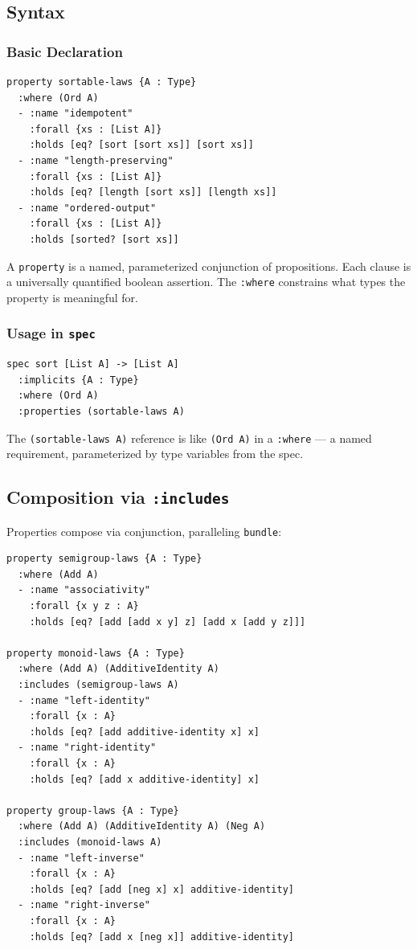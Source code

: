 \documentclass[11pt]{article}
\begin{document}
\subsection{Syntax}
\label{sec:org81e4d5a}

\subsubsection{Basic Declaration}
\label{sec:org1de4fc8}

\begin{verbatim}
property sortable-laws {A : Type}
  :where (Ord A)
  - :name "idempotent"
    :forall {xs : [List A]}
    :holds [eq? [sort [sort xs]] [sort xs]]
  - :name "length-preserving"
    :forall {xs : [List A]}
    :holds [eq? [length [sort xs]] [length xs]]
  - :name "ordered-output"
    :forall {xs : [List A]}
    :holds [sorted? [sort xs]]
\end{verbatim}

A \texttt{property} is a named, parameterized conjunction of propositions. Each clause
is a universally quantified boolean assertion. The \texttt{:where} constrains what
types the property is meaningful for.
\subsubsection{Usage in \texttt{spec}}
\label{sec:orgfc98e01}

\begin{verbatim}
spec sort [List A] -> [List A]
  :implicits {A : Type}
  :where (Ord A)
  :properties (sortable-laws A)
\end{verbatim}

The \texttt{(sortable-laws A)} reference is like \texttt{(Ord A)} in a \texttt{:where} --- a named
requirement, parameterized by type variables from the spec.
\subsection{Composition via \texttt{:includes}}
\label{sec:org95991e5}

Properties compose via conjunction, paralleling \texttt{bundle}:

\begin{verbatim}
property semigroup-laws {A : Type}
  :where (Add A)
  - :name "associativity"
    :forall {x y z : A}
    :holds [eq? [add [add x y] z] [add x [add y z]]]

property monoid-laws {A : Type}
  :where (Add A) (AdditiveIdentity A)
  :includes (semigroup-laws A)
  - :name "left-identity"
    :forall {x : A}
    :holds [eq? [add additive-identity x] x]
  - :name "right-identity"
    :forall {x : A}
    :holds [eq? [add x additive-identity] x]

property group-laws {A : Type}
  :where (Add A) (AdditiveIdentity A) (Neg A)
  :includes (monoid-laws A)
  - :name "left-inverse"
    :forall {x : A}
    :holds [eq? [add [neg x] x] additive-identity]
  - :name "right-inverse"
    :forall {x : A}
    :holds [eq? [add x [neg x]] additive-identity]
\end{verbatim}
\end{document}
